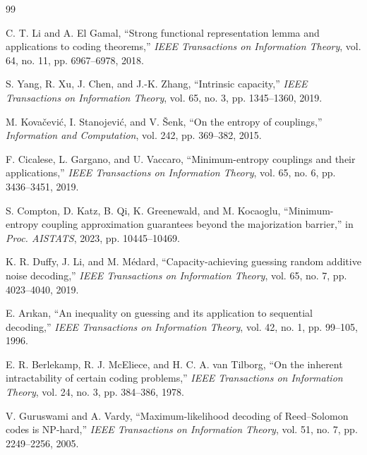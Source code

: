 \documentclass[11pt]{article}
\theoremstyle{definition}
\theoremstyle{remark}
\begin{document}
\begin{thebibliography}{99}

C. T. Li and A. El Gamal, ``Strong functional representation lemma and applications to coding theorems,'' \emph{IEEE Transactions on Information Theory}, vol. 64, no. 11, pp. 6967--6978, 2018.

S. Yang, R. Xu, J. Chen, and J.-K. Zhang, ``Intrinsic capacity,'' \emph{IEEE Transactions on Information Theory}, vol. 65, no. 3, pp. 1345--1360, 2019.

M. Kova\v{c}evi\'c, I. Stanojevi\'c, and V. \v{S}enk, ``On the entropy of couplings,'' \emph{Information and Computation}, vol. 242, pp. 369--382, 2015.

F. Cicalese, L. Gargano, and U. Vaccaro, ``Minimum-entropy couplings and their applications,'' \emph{IEEE Transactions on Information Theory}, vol. 65, no. 6, pp. 3436--3451, 2019.

S. Compton, D. Katz, B. Qi, K. Greenewald, and M. Kocaoglu, ``Minimum-entropy coupling approximation guarantees beyond the majorization barrier,'' in \emph{Proc. AISTATS}, 2023, pp. 10445--10469.

K. R. Duffy, J. Li, and M. M\'edard, ``Capacity-achieving guessing random additive noise decoding,'' \emph{IEEE Transactions on Information Theory}, vol. 65, no. 7, pp. 4023--4040, 2019.

E. Ar\i kan, ``An inequality on guessing and its application to sequential decoding,'' \emph{IEEE Transactions on Information Theory}, vol. 42, no. 1, pp. 99--105, 1996.

E. R. Berlekamp, R. J. McEliece, and H. C. A. van Tilborg, ``On the inherent intractability of certain coding problems,'' \emph{IEEE Transactions on Information Theory}, vol. 24, no. 3, pp. 384--386, 1978.

V. Guruswami and A. Vardy, ``Maximum-likelihood decoding of Reed--Solomon codes is NP-hard,'' \emph{IEEE Transactions on Information Theory}, vol. 51, no. 7, pp. 2249--2256, 2005.

\end{thebibliography}
\end{document}
